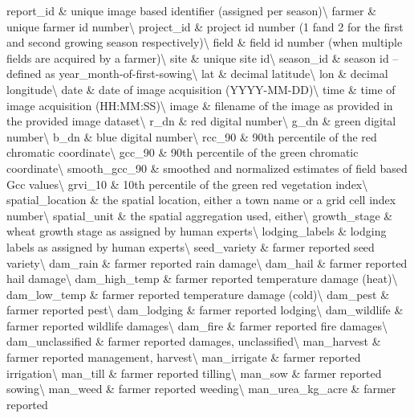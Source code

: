 \documentclass[
  landscape]{article}
\begin{document}
report\_id \& unique image based identifier (assigned per
season)\textbackslash{} farmer \& unique farmer id
number\textbackslash{} project\_id \& project id number (1 fand 2 for
the first and second growing season respectively)\textbackslash{} field
\& field id number (when multiple fields are acquired by a
farmer)\textbackslash{} site \& unique site id\textbackslash{}
\addlinespace season\_id \& season id -- defined as
year\_month-of-first-sowing\textbackslash{} lat \& decimal
latitude\textbackslash{} lon \& decimal longitude\textbackslash{} date
\& date of image acquisition (YYYY-MM-DD)\textbackslash{} time \& time
of image acquisition (HH:MM:SS)\textbackslash{} \addlinespace image \&
filename of the image as provided in the provided image
dataset\textbackslash{} r\_dn \& red digital number\textbackslash{}
g\_dn \& green digital number\textbackslash{} b\_dn \& blue digital
number\textbackslash{} rcc\_90 \& 90th percentile of the red chromatic
coordinate\textbackslash{} \addlinespace gcc\_90 \& 90th percentile of
the green chromatic coordinate\textbackslash{} smooth\_gcc\_90 \&
smoothed and normalized estimates of field based Gcc
values\textbackslash{} grvi\_10 \& 10th percentile of the green red
vegetation index\textbackslash{} spatial\_location \& the spatial
location, either a town name or a grid cell index number\textbackslash{}
spatial\_unit \& the spatial aggregation used, either\textbackslash{}
\addlinespace growth\_stage \& wheat growth stage as assigned by human
experts\textbackslash{} lodging\_labels \& lodging labels as assigned by
human experts\textbackslash{} seed\_variety \& farmer reported seed
variety\textbackslash{} dam\_rain \& farmer reported rain
damage\textbackslash{} dam\_hail \& farmer reported hail
damage\textbackslash{} \addlinespace dam\_high\_temp \& farmer reported
temperature damage (heat)\textbackslash{} dam\_low\_temp \& farmer
reported temperature damage (cold)\textbackslash{} dam\_pest \& farmer
reported pest\textbackslash{} dam\_lodging \& farmer reported
lodging\textbackslash{} dam\_wildlife \& farmer reported wildlife
damages\textbackslash{} \addlinespace dam\_fire \& farmer reported fire
damages\textbackslash{} dam\_unclassified \& farmer reported damages,
unclassified\textbackslash{} man\_harvest \& farmer reported management,
harvest\textbackslash{} man\_irrigate \& farmer reported
irrigation\textbackslash{} man\_till \& farmer reported
tilling\textbackslash{} \addlinespace man\_sow \& farmer reported
sowing\textbackslash{} man\_weed \& farmer reported
weeding\textbackslash{} man\_urea\_kg\_acre \& farmer reported
\end{document}
